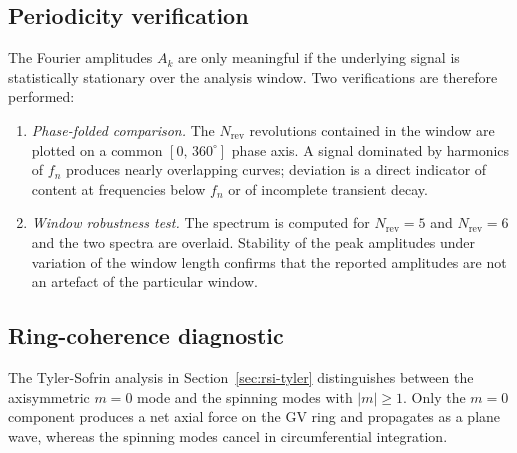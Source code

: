 \subsection{Periodicity verification}
\label{sec:spec-periodicity}
 
The Fourier amplitudes $A_k$ are only meaningful if the underlying signal is statistically stationary over the analysis window. Two verifications are therefore performed:
\begin{enumerate}
  \item \emph{Phase-folded comparison.} The $N_{\mathrm{rev}}$ revolutions contained in the window are plotted on a common $[0,\,360^\circ]$ phase axis. A signal dominated by harmonics of $f_n$ produces nearly overlapping curves; deviation is a direct indicator of content at frequencies below $f_n$ or of incomplete transient decay.
  \item \emph{Window robustness test.} The spectrum is computed for $N_{\mathrm{rev}} = 5$ and $N_{\mathrm{rev}} = 6$ and the two spectra are overlaid. Stability of the peak amplitudes under variation of the window length confirms that the reported amplitudes are not an artefact of the particular window.
\end{enumerate}
 
\subsection{Ring-coherence diagnostic}
\label{sec:spec-coherence}
 
The Tyler-Sofrin analysis in Section~\ref{sec:rsi-tyler} distinguishes between the axisymmetric $m=0$ mode and the spinning modes with $|m|\geq 1$. Only the $m=0$ component produces a net axial force on the GV ring and propagates as a plane wave, whereas the spinning modes cancel in circumferential integration.
 
